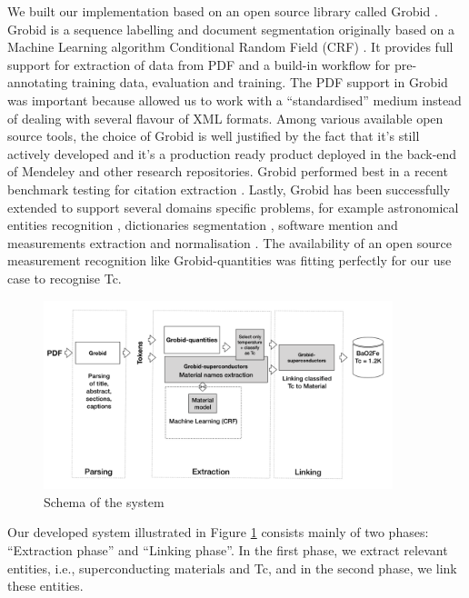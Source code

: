 \documentclass{article}[a4]
\begin{document}
We built our implementation based on an open source library called Grobid \cite{GROBID}. Grobid is a sequence labelling and document segmentation originally based on a Machine Learning algorithm Conditional Random Field (CRF) \cite{lafferty2001conditional}. It provides full support for extraction of data from PDF and a build-in workflow for pre-annotating training data, evaluation and training. 
The PDF support in Grobid was important because allowed us to work with a “standardised” medium instead of dealing with several flavour of XML formats. Among various available open source tools, the choice of Grobid is well justified by the fact that it's still actively developed and it's a production ready product deployed in the back-end of Mendeley \cite{mendeley-extraction} and other research repositories. Grobid performed best in a recent benchmark testing for citation extraction \cite{DBLP:journals/corr/abs-1802-01168}. Lastly, Grobid has been successfully extended to support several domains specific problems, for example astronomical entities recognition \cite{grobid-astro}, dictionaries segmentation \cite{khemakhem2017automatic}, software mention \cite{software-mentions} and measurements extraction and normalisation \cite{grobid-quantities}. The availability of an open source measurement recognition like Grobid-quantities was fitting perfectly for our use case to recognise Tc. 

\begin{figure}[]
    \centering
    \includegraphics[width=4in]{schema}
    \caption[Schema of the system] {Schema of the system}
    \label{fig:system-schema}
\end{figure}

Our developed system illustrated in Figure \ref{fig:system-schema} consists mainly of two phases: “Extraction phase” and “Linking phase”. In the first phase, we extract relevant entities, i.e., superconducting materials and Tc, and in the second phase, we link these entities.
\end{document}
